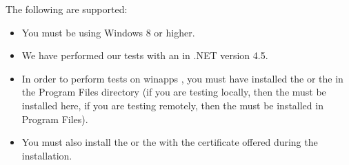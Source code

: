 The  following \gdauts{} are supported:

\begin{itemize}
\item You must be using Windows 8 or higher. 
\item We have performed our tests with an  \gdaut{} in .NET version 4.5.
\item In order to perform tests on winapps \gdauts{}, you must have installed the \ite{} or the \gdagent{} in the Program Files directory (if you are testing locally, then the \ite{} must be installed here, if you are testing remotely, then the \gdagent{} must be installed in Program Files). 
\item You must also install the \ite{} or the \gdagent{} with the certificate offered during the installation. 
\end{itemize}




